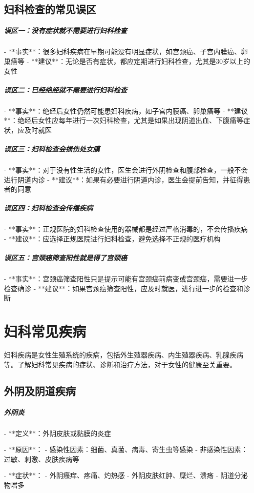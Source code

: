 \begin{enumerate}
\subsection{妇科检查的常见误区}

\subparagraph{误区一：没有症状就不需要进行妇科检查}

- **事实**：很多妇科疾病在早期可能没有明显症状，如宫颈癌、子宫内膜癌、卵巢癌等
- **建议**：无论是否有症状，都应定期进行妇科检查，尤其是30岁以上的女性

\subparagraph{误区二：已经绝经就不需要进行妇科检查}

- **事实**：绝经后女性仍然可能患妇科疾病，如子宫内膜癌、卵巢癌等
- **建议**：绝经后女性应每年进行一次妇科检查，尤其是如果出现阴道出血、下腹痛等症状，应及时就医

\subparagraph{误区三：妇科检查会损伤处女膜}

- **事实**：对于没有性生活的女性，医生会进行外阴检查和腹部检查，一般不会进行阴道内诊
- **建议**：如果有必要进行阴道内诊，医生会提前告知，并征得患者的同意

\subparagraph{误区四：妇科检查会传播疾病}

- **事实**：正规医院的妇科检查使用的器械都是经过严格消毒的，不会传播疾病
- **建议**：应选择正规医院进行妇科检查，避免选择不正规的医疗机构

\subparagraph{误区五：宫颈癌筛查阳性就是得了宫颈癌}

- **事实**：宫颈癌筛查阳性只是提示可能有宫颈癌前病变或宫颈癌，需要进一步检查确诊
- **建议**：如果宫颈癌筛查阳性，应及时就医，进行进一步的检查和诊断

\section{妇科常见疾病}

妇科疾病是女性生殖系统的疾病，包括外生殖器疾病、内生殖器疾病、乳腺疾病等。了解妇科常见疾病的症状、诊断和治疗方法，对于女性的健康至关重要。

\subsection{外阴及阴道疾病}

\subparagraph{外阴炎}

- **定义**：外阴皮肤或黏膜的炎症

- **原因**：
  - 感染性因素：细菌、真菌、病毒、寄生虫等感染
  - 非感染性因素：过敏、刺激、皮肤疾病等

- **症状**：
  - 外阴瘙痒、疼痛、灼热感
  - 外阴皮肤红肿、糜烂、溃疡
  - 阴道分泌物增多


\end{enumerate}
